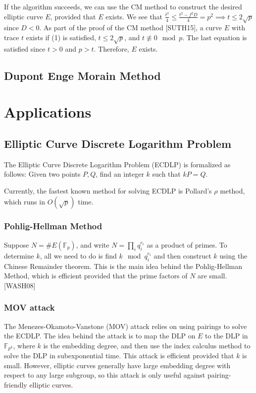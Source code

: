 \documentclass[12pt,twoside]{article}
\begin{document}
\noindent If the algorithm succeeds, we can use the CM method to construct the desired elliptic curve $E$, provided that $E$ exists. We see that $\frac{t^2}{4} \leq \frac{t^2 - f^2 D}{4} = p^2 \implies t \leq 2 \sqrt p $ since $ D < 0$. As part of the proof of the CM method [SUTH15], a curve $E$ with trace $t$ exists if (1) is satisfied, $t \leq 2 \sqrt p$, and $t \not \equiv 0 \mod p$. The last equation is satisfied since $t > 0$ and $p > t$. Therefore, $E$ exists.



\subsection{Dupont Enge Morain Method}

\section{Applications} 


\subsection{Elliptic Curve Discrete Logarithm Problem}
The Elliptic Curve Discrete Logarithm Problem (ECDLP) is formalized as follows:
Given two points $P,Q$, find an integer $k$ such that $kP = Q$.

Currently, the fastest known method for solving ECDLP is Pollard's $\rho$ method, which runs in $O(\sqrt p)$ time.

\subsubsection{Pohlig-Hellman Method}
Suppose $N = \#E(\mathbb F_p)$, and write $ N = \prod_{i}q_{i}^{e_{i}}$ as a product of primes. To determine $k$, all we need to do is find $k \mod q^{e_i}_i$ and then construct $k$ using the Chinese Remainder theorem. This is the main idea behind the Pohlig-Hellman Method, which is efficient provided that the prime factors of $N$ are small. [WASH08]


\subsubsection{MOV attack}

The Menezes-Okamoto-Vanstone (MOV) attack relies on using pairings to solve the ECDLP. The idea behind the attack is to map the DLP on $E$ to the DLP in $\mathbb F_{p^k}$, where $k$ is the embedding degree, and then use the index calculus method to solve the DLP in subexponential time. This attack is efficient provided that $k$ is small. However, elliptic curves generally have large embedding degree with respect to any large subgroup, so this attack is only useful against pairing-friendly elliptic curves.



 

\end{document}

